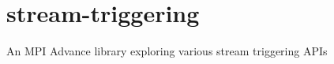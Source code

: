 \chapter{stream-\/triggering}
\hypertarget{md_README}{}\label{md_README}
\label{md_README_autotoc_md0}%
%
An MPI Advance library exploring various stream triggering APIs 